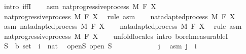 \begin{isabellebody}
%
\isadelimproof
%
\endisadelimproof
%
\isatagproof
{}\isamarkupfalse%
\ {\isacharparenleft}{\kern0pt}intro\ iffI{\isacharparenright}{\kern0pt}\isanewline
\ \ \isamarkupfalse%
\ asm{\isacharcolon}{\kern0pt}\ {\isachardoublequoteopen}nat{\isacharunderscore}{\kern0pt}progressive{\isacharunderscore}{\kern0pt}process\ M\ F\ X{\isachardoublequoteclose}\isanewline
\ \ \isamarkupfalse%
\ nat{\isacharunderscore}{\kern0pt}progressive{\isacharunderscore}{\kern0pt}process\ M\ F\ X\ \isamarkupfalse%
\ {\isacharparenleft}{\kern0pt}rule\ asm{\isacharparenright}{\kern0pt}\isanewline
\ \ \isamarkupfalse%
\ {\isachardoublequoteopen}nat{\isacharunderscore}{\kern0pt}adapted{\isacharunderscore}{\kern0pt}process\ M\ F\ X{\isachardoublequoteclose}\ \isacommand{{\isachardot}{\kern0pt}{\isachardot}{\kern0pt}}\isamarkupfalse%
\isanewline
{}\isamarkupfalse%
\isanewline
\ \ \isamarkupfalse%
\ asm{\isacharcolon}{\kern0pt}\ {\isachardoublequoteopen}nat{\isacharunderscore}{\kern0pt}adapted{\isacharunderscore}{\kern0pt}process\ M\ F\ X{\isachardoublequoteclose}\isanewline
\ \ \isamarkupfalse%
\ nat{\isacharunderscore}{\kern0pt}adapted{\isacharunderscore}{\kern0pt}process\ M\ F\ X\ \isamarkupfalse%
\ {\isacharparenleft}{\kern0pt}rule\ asm{\isacharparenright}{\kern0pt}\ \isanewline
\ \ \isamarkupfalse%
\ {\isachardoublequoteopen}nat{\isacharunderscore}{\kern0pt}progressive{\isacharunderscore}{\kern0pt}process\ M\ F\ X{\isachardoublequoteclose}\isanewline
\ \ \isamarkupfalse%
\ {\isacharparenleft}{\kern0pt}unfold{\isacharunderscore}{\kern0pt}locales{\isacharcomma}{\kern0pt}\ intro\ borel{\isacharunderscore}{\kern0pt}measurableI{\isacharparenright}{\kern0pt}\isanewline
\ \ \ \ \isamarkupfalse%
\ S\ {\isacharcolon}{\kern0pt}{\isacharcolon}{\kern0pt}\ {\isachardoublequoteopen}{\isacharprime}{\kern0pt}b\ set{\isachardoublequoteclose}\ \ i\ {\isacharcolon}{\kern0pt}{\isacharcolon}{\kern0pt}\ nat\ \isamarkupfalse%
\ open{\isacharunderscore}{\kern0pt}S{\isacharcolon}{\kern0pt}\ {\isachardoublequoteopen}open\ S{\isachardoublequoteclose}\isanewline
\ \ \ \ \isacommand{{\isacharbraceleft}{\kern0pt}}\isamarkupfalse%
\isanewline
\ \ \ \ \ \ \isamarkupfalse%
\ j\ \isamarkupfalse%
\ asm{\isacharcolon}{\kern0pt}\ {\isachardoublequoteopen}j\ {\isasymle}\ i{\isachardoublequoteclose}\isanewline
\ \ \ \ \ \ \isamarkupfalse%

\end{isabellebody}
